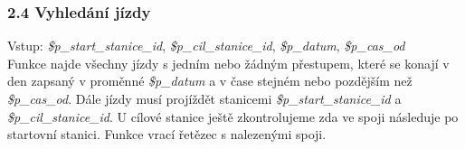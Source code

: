 \documentclass[11pt]{article}
\begin{document}

\subsubsection*{2.4 Vyhledání jízdy}
Vstup: \textit{\$p\_start\_stanice\_id}, \textit{\$p\_cil\_stanice\_id}, \textit{\$p\_datum}, \textit{\$p\_cas\_od}\\
Funkce najde všechny jízdy s jedním nebo žádným přestupem, které se konají v den zapsaný v proměnné \textit{\$p\_datum} a v čase stejném nebo pozdějším než \textit{\$p\_cas\_od}. Dále jízdy musí projíždět stanicemi \textit{\$p\_start\_stanice\_id} a \textit{\$p\_cil\_stanice\_id}. U cílové stanice ještě zkontrolujeme zda ve spoji následuje po startovní stanici. Funkce vrací řetězec s nalezenými spoji.
\end{document}
